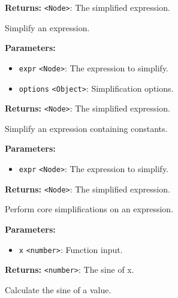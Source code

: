 \documentclass[12pt,a4paper]{article}
\begin{document}
\noindent \textbf{Returns:} \texttt{<Node>}: The simplified expression.

\noindent Simplify an expression.

\vspace{5mm}
\noindent {}


\noindent \textbf{Parameters:}
\begin{itemize}
  \item \texttt{expr} \texttt{<Node>}: The expression to simplify.
  \item \texttt{options} \texttt{<Object>}: Simplification options.
\end{itemize}

\noindent \textbf{Returns:} \texttt{<Node>}: The simplified expression.

\noindent Simplify an expression containing constants.

\vspace{5mm}
\noindent {}


\noindent \textbf{Parameters:}
\begin{itemize}
  \item \texttt{expr} \texttt{<Node>}: The expression to simplify.
\end{itemize}

\noindent \textbf{Returns:} \texttt{<Node>}: The simplified expression.

\noindent Perform core simplifications on an expression.

\vspace{5mm}
\noindent {}


\noindent \textbf{Parameters:}
\begin{itemize}
  \item \texttt{x} \texttt{<number>}: Function input.
\end{itemize}

\noindent \textbf{Returns:} \texttt{<number>}: The sine of x.

\noindent Calculate the sine of a value.

\vspace{5mm}
\noindent {}
\end{document}
